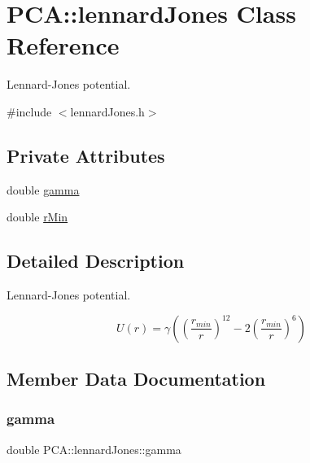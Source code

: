 \hypertarget{class_p_c_a_1_1lennard_jones}{}\section{P\+CA\+:\+:lennard\+Jones Class Reference}
\label{class_p_c_a_1_1lennard_jones}


Lennard-\/\+Jones potential.  




{\ttfamily \#include $<$lennard\+Jones.\+h$>$}

\subsection*{Private Attributes}
\begin{DoxyCompactItemize}
\item 
double \hyperlink{class_p_c_a_1_1lennard_jones_ad696584256b66e970fdd4b963ffbf0fe}{gamma}
\item 
double \hyperlink{class_p_c_a_1_1lennard_jones_a96222c4266786b9dafa23301034e2fb6}{r\+Min}
\end{DoxyCompactItemize}


\subsection{Detailed Description}
Lennard-\/\+Jones potential. 

\[ U(r)= \gamma \left( \left(\frac{r_{min}}{r}\right)^{12} - 2 \left(\frac{r_{min}}{r}\right)^6\right)\] 

\subsection{Member Data Documentation}
\hypertarget{class_p_c_a_1_1lennard_jones_ad696584256b66e970fdd4b963ffbf0fe}{}\label{class_p_c_a_1_1lennard_jones_ad696584256b66e970fdd4b963ffbf0fe} 
\subsubsection{\texorpdfstring{gamma}{gamma}}
{\footnotesize\ttfamily double P\+C\+A\+::lennard\+Jones\+::gamma\hspace{0.3cm}{\ttfamily [private]}}

\hypertarget{class_p_c_a_1_1lennard_jones_a96222c4266786b9dafa23301034e2fb6}{}\label{class_p_c_a_1_1lennard_jones_a96222c4266786b9dafa23301034e2fb6} 

